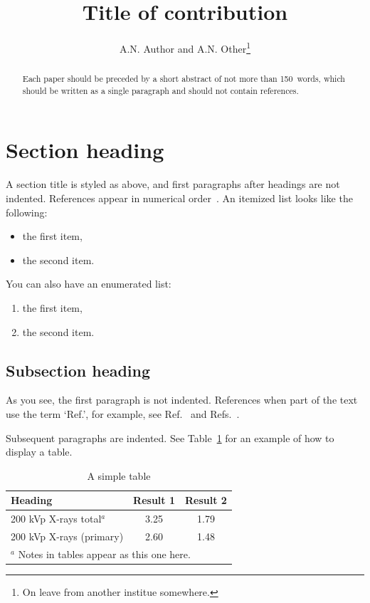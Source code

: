\title{Title of contribution}
\author{A.N. Author and A.N. Other\thanks
                 {On leave from another institue somewhere.}}
\maketitle

\begin{abstract}
Each paper should be preceded by a short abstract of not more 
than 150~words, which should be written as a single paragraph 
and should not contain references.
\end{abstract}

\section{Section heading}

A section title is styled as above, and first paragraphs after
headings are not indented. References appear in numerical
order~\cite{Raby1966,Dupont1961}. An itemized list looks like the following:
\begin{itemize}
\item the first item,
\item the second item.
\end{itemize}

You can also have an enumerated list:

\begin{enumerate}
\item the first item,
\item the second item.
\end{enumerate}

\subsection{Subsection heading}

As you see, the first paragraph is not indented. References when part
      of the text use the term `Ref.', for example, see
      Ref.~\cite{Raby1966} and
      Refs.~\cite{Appleman1959,vanBerg1965,Bryant1985,Allen1977}.

Subsequent paragraphs are indented. See Table~\ref{tab:LET} for an
example of how to display a table.

\begin{table}[h]
\begin{center}
\caption{A simple table}
\label{tab:LET}
\begin{tabular}{p{6cm}cc}
\hline\hline
\textbf{Heading}             & \textbf{Result 1}
                                                & \textbf{Result 2}\\
\hline
200 kVp X-rays total$^{a}$   & 3.25             & 1.79 \\
200 kVp X-rays (primary)     & 2.60             & 1.48 \\
\hline\hline
\multicolumn{3}{l}{$^{a}$ \footnotesize Notes in tables appear as
                      this one here.}
\end{tabular}
\end{center}
\end{table}

